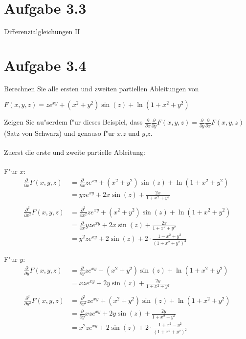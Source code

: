 \documentclass{theozettel}
\begin{document}
\section*{Aufgabe 3.3}Differenzialgleichungen II\\


\newpage
\section*{Aufgabe 3.4}Berechnen Sie alle ersten und zweiten partiellen Ableitungen von
\begin{center}
$F\left(x,y,z\right)=ze^{xy}+\left(x^2+y^2\right)\sin\left(z\right)+\ln\left(1+x^2+y^2\right)$
\end{center}
Zeigen Sie au"serdem f"ur dieses Beispiel, dass $\frac{\partial}{\partial x}\frac{\partial}{\partial y}F\left(x,y,z\right) =\frac{\partial}{\partial y}\frac{\partial}{\partial x}F\left(x,y,z\right)$ (Satz von Schwarz) und genauso f"ur $x$,$z$ und $y$,$z$.\\\\
Zuerst die erste und zweite partielle Ableitung:\\\\
F"ur $x$:\\
\begin{align*}
\frac{\partial}{\partial x}F\left(x,y,z\right) &=\frac{\partial}{\partial x}ze^{xy}+\left(x^2+y^2\right)\sin\left(z\right)+\ln\left(1+x^2+y^2\right)\\
&=yze^{xy}+2x\sin\left(z\right)+\frac{2x}{1+x^2+y^2}\\\\
\frac{\partial^2}{\partial x^2}F\left(x,y,z\right) &=\frac{\partial^2}{\partial x^2}ze^{xy}+\left(x^2+y^2\right)\sin\left(z\right)+\ln\left(1+x^2+y^2\right)\\
&=\frac{\partial}{\partial x}yze^{xy}+2x\sin\left(z\right)+\frac{2x}{1+x^2+y^2}\\
&= y^2 z e^{xy}+2\sin\left(z\right) +2 \cdot\frac{1-x^2+y^2}{\left(1+x^2+y^2\right)^2}
\end{align*}

F"ur $y$:\\
\begin{align*}
\frac{\partial}{\partial y}F\left(x,y,z\right) &=\frac{\partial}{\partial y}ze^{xy}+\left(x^2+y^2\right)\sin\left(z\right)+\ln\left(1+x^2+y^2\right)\\
&=xze^{xy}+2y\sin\left(z\right)+\frac{2y}{1+x^2+y^2}\\\\
\frac{\partial^2}{\partial y^2}F\left(x,y,z\right) &=\frac{\partial^2}{\partial y^2}ze^{xy}+\left(x^2+y^2\right)\sin\left(z\right)+\ln\left(1+x^2+y^2\right)\\
&=\frac{\partial}{\partial y}xze^{xy}+2y\sin\left(z\right)+\frac{2y}{1+x^2+y^2}\\
&= x^2 z e^{xy}+2\sin\left(z\right) +2 \cdot\frac{1+x^2-y^2}{\left(1+x^2+y^2\right)^2}
\end{align*}
\end{document}
